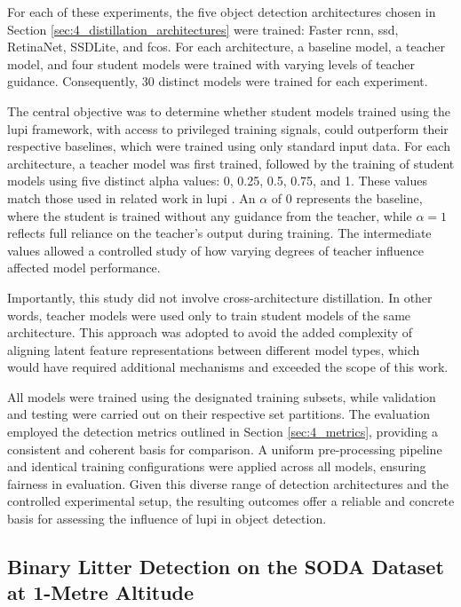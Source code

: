 For each of these experiments, the five object detection architectures chosen in Section \ref{sec:4_distillation_architectures} were trained: Faster \gls{rcnn}, \gls{ssd}, RetinaNet, SSDLite, and \gls{fcos}. For each architecture, a baseline model, a teacher model, and four student models were trained with varying levels of teacher guidance. Consequently, 30 distinct models were trained for each experiment.

The central objective was to determine whether student models trained using the \gls{lupi} framework, with access to privileged training signals, could outperform their respective baselines, which were trained using only standard input data. For each architecture, a teacher model was first trained, followed by the training of student models using five distinct \gls{alpha} values: 0, 0.25, 0.5, 0.75, and 1. These values match those used in related work in \gls{lupi} \cite{lab2wild}. An $\alpha$ of 0 represents the baseline, where the student is trained without any guidance from the teacher, while $\alpha = 1$ reflects full reliance on the teacher’s output during training. The intermediate values allowed a controlled study of how varying degrees of teacher influence affected model performance.


Importantly, this study did not involve cross-architecture distillation. In other words, teacher models were used only to train student models of the same architecture. This approach was adopted to avoid the added complexity of aligning latent feature representations between different model types, which would have required additional mechanisms and exceeded the scope of this work.

All models were trained using the designated training subsets, while validation and testing were carried out on their respective set partitions. The evaluation employed the detection metrics outlined in Section \ref{sec:4_metrics}, providing a consistent and coherent basis for comparison. A uniform pre-processing pipeline and identical training configurations were applied across all models, ensuring fairness in evaluation. Given this diverse range of detection architectures and the controlled experimental setup, the resulting outcomes offer a reliable and concrete basis for assessing the influence of \gls{lupi} in object detection.


\subsection{Binary Litter Detection on the SODA Dataset at 1-Metre Altitude}
\label{subsec:5_soda01m_dataset_exp}

